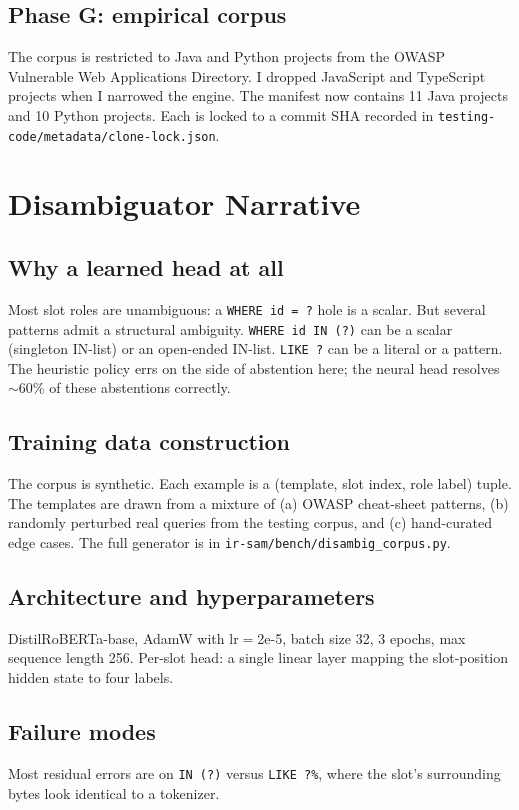 \documentclass[a4paper,11pt]{report}
\begin{document}
\section{Phase G: empirical corpus}
The corpus is restricted to Java and Python projects from the OWASP Vulnerable Web Applications Directory. I dropped JavaScript and TypeScript projects when I narrowed the engine. The manifest now contains 11 Java projects and 10 Python projects. Each is locked to a commit SHA recorded in \texttt{testing-code/metadata/clone-lock.json}.

\chapter{Disambiguator Narrative}\label{ch:disambig}
\section{Why a learned head at all}
Most slot roles are unambiguous: a \texttt{WHERE id = ?} hole is a scalar. But several patterns admit a structural ambiguity. \texttt{WHERE id IN (?)} can be a scalar (singleton IN-list) or an open-ended IN-list. \texttt{LIKE ?} can be a literal or a pattern. The heuristic policy errs on the side of abstention here; the neural head resolves $\sim$60\% of these abstentions correctly.

\section{Training data construction}
The corpus is synthetic. Each example is a (template, slot index, role label) tuple. The templates are drawn from a mixture of (a) OWASP cheat-sheet patterns, (b) randomly perturbed real queries from the testing corpus, and (c) hand-curated edge cases. The full generator is in \texttt{ir-sam/bench/disambig\_corpus.py}.

\section{Architecture and hyperparameters}
DistilRoBERTa-base, AdamW with lr$=$2e-5, batch size 32, 3 epochs, max sequence length 256. Per-slot head: a single linear layer mapping the slot-position hidden state to four labels.

\section{Failure modes}
Most residual errors are on \texttt{IN (?)} versus \texttt{LIKE ?\%}, where the slot's surrounding bytes look identical to a tokenizer.
\end{document}
